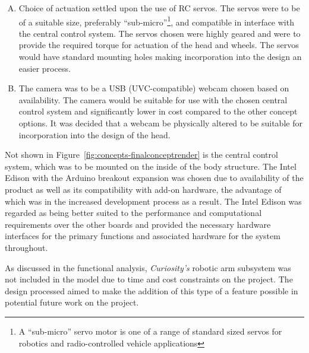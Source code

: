 \begin{enumerate}[A.]
      \item Choice of actuation settled upon the use of RC servos. The servos were to be of a suitable size, preferably ``sub-micro''\footnote{A ``sub-micro'' servo motor is one of a range of standard sized servos for robotics and radio-controlled vehicle applications}, and compatible in interface with the central control system. The servos chosen were highly geared and were to provide the required torque for actuation of the head and wheels. The servos would have standard mounting holes making incorporation into the design an easier process.
      \item The camera was to be a USB (UVC-compatible) webcam chosen based on availability. The camera would be suitable for use with the chosen central control system and significantly lower in cost compared to the other concept options. It was decided that a webcam be physically altered to be suitable for incorporation into the design of the head.
    \end{enumerate}
    
    Not shown in Figure~\ref{fig:concepts-finalconceptrender} is the central control system, which was to be mounted on the inside of the body structure. The Intel Edison with the Arduino breakout expansion was chosen due to availability of the product as well as its compatibility with add-on hardware, the advantage of which was in the increased development process as a result. The Intel Edison was regarded as being better suited to the performance and computational requirements over the other boards and provided the necessary hardware interfaces for the primary functions and associated hardware for the system throughout.
    
    As discussed in the functional analysis, \textit{Curiosity's} robotic arm subsystem was not included in the model due to time and cost constraints on the project. The design processed aimed to make the addition of this type of a feature possible in potential future work on the project.

    